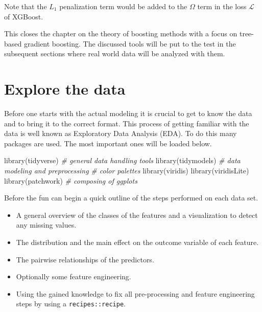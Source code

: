 \documentclass[
]{book}
\newenvironment{Shaded}{\begin{snugshade}}{\end{snugshade}}
\newcommand{\CommentTok}[1]{\textcolor[rgb]{0.56,0.35,0.01}{\textit{#1}}}
\newcommand{\FunctionTok}[1]{\textcolor[rgb]{0.00,0.00,0.00}{#1}}
\newcommand{\NormalTok}[1]{#1}
\providecommand{\tightlist}{%
  \setlength{\itemsep}{0pt}\setlength{\parskip}{0pt}}
\begin{document}
Note that the \(L_1\) penalization term would be added to the \(\Omega\) term in the loss \(\mathcal{L}\) of XGBoost.

This closes the chapter on the theory of boosting methods with a focus on tree-based gradient boosting. The discussed tools will be put to the test in the subsequent sections where real world data will be analyzed with them.

\hypertarget{eda}{%
\chapter{Explore the data}\label{eda}}

Before one starts with the actual modeling it is crucial to get to know the data and to bring it to the correct format. This process of getting familiar with the data is well known as Exploratory Data Analysis (EDA). To do this many packages are used.\citetext{\citealp{tidyverse}; \citealp{tidymodels}; \citealp{viridis}; \citealp{ggtext}; \citealp[ ]{viridisLite}; \citealp{patchwork}; \citealp{visdat}; \citealp{lubridate}; \citealp{latexplots}; \citealp{ggally}; \citealp{plotly}} The most important ones will be loaded below.

\begin{Shaded}
\begin{Highlighting}[]
\FunctionTok{library}\NormalTok{(tidyverse) }\CommentTok{\# general data handling tools}
\FunctionTok{library}\NormalTok{(tidymodels) }\CommentTok{\# data modeling and preprocessing}
\CommentTok{\# color palettes}
\FunctionTok{library}\NormalTok{(viridis)}
\FunctionTok{library}\NormalTok{(viridisLite)}
\FunctionTok{library}\NormalTok{(patchwork) }\CommentTok{\# composing of ggplots}
\end{Highlighting}
\end{Shaded}

Before the fun can begin a quick outline of the steps performed on each data set.

\begin{itemize}
\tightlist
\item
  A general overview of the classes of the features and a visualization to detect any missing values.
\item
  The distribution and the main effect on the outcome variable of each feature.
\item
  The pairwise relationships of the predictors.
\item
  Optionally some feature engineering.
\item
  Using the gained knowledge to fix all pre-processing and feature engineering steps by using a \texttt{recipes::recipe}.
\end{itemize}
\end{document}
